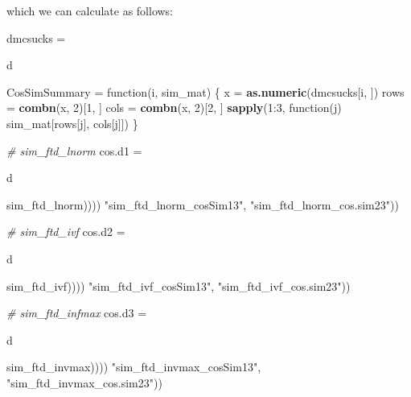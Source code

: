 \documentclass[10pt]{report}
\newenvironment{Shaded}{}{}
\newcommand{\KeywordTok}[1]{\textcolor[rgb]{0.00,0.44,0.13}{\textbf{{#1}}}}
\newcommand{\DecValTok}[1]{\textcolor[rgb]{0.25,0.63,0.44}{{#1}}}
\newcommand{\StringTok}[1]{\textcolor[rgb]{0.25,0.44,0.63}{{#1}}}
\newcommand{\CommentTok}[1]{\textcolor[rgb]{0.38,0.63,0.69}{\textit{{#1}}}}
\newcommand{\NormalTok}[1]{{#1}}
\begin{document}
which we can calculate as follows:

\begin{Shaded}
\begin{Highlighting}[]
\NormalTok{dmcsucks =}\StringTok{ }\NormalTok{d %>%}\StringTok{ }\KeywordTok{arrange}\NormalTok{(orderID) %>%}\StringTok{ }\KeywordTok{select}\NormalTok{(couponID1, couponID2, couponID3)}

\NormalTok{CosSimSummary =}\StringTok{ }\NormalTok{function(i, sim_mat) \{}
    \NormalTok{x =}\StringTok{ }\KeywordTok{as.numeric}\NormalTok{(dmcsucks[i, ])}
    \NormalTok{rows =}\StringTok{ }\KeywordTok{combn}\NormalTok{(x, }\DecValTok{2}\NormalTok{)[}\DecValTok{1}\NormalTok{, ]}
    \NormalTok{cols =}\StringTok{ }\KeywordTok{combn}\NormalTok{(x, }\DecValTok{2}\NormalTok{)[}\DecValTok{2}\NormalTok{, ]}
    \KeywordTok{sapply}\NormalTok{(}\DecValTok{1}\NormalTok{:}\DecValTok{3}\NormalTok{, function(j) sim_mat[rows[j], cols[j]])}
\NormalTok{\}}

\CommentTok{# sim_ftd_lnorm}
\NormalTok{cos.d1 =}\StringTok{ }\NormalTok{d %>%}\StringTok{ }\KeywordTok{select}\NormalTok{(orderID) %>%}\StringTok{ }\KeywordTok{cbind}\NormalTok{(}\KeywordTok{t}\NormalTok{(}\KeywordTok{sapply}\NormalTok{(}\DecValTok{1}\NormalTok{:}\KeywordTok{nrow}\NormalTok{(dmcsucks), function(i) }\KeywordTok{CosSimSummary}\NormalTok{(i, }
    \NormalTok{sim_ftd_lnorm)))) %>%}\StringTok{ }\NormalTok{data.frame %>%}\StringTok{ }\KeywordTok{renm}\NormalTok{(}\KeywordTok{c}\NormalTok{(}\StringTok{"orderID"}\NormalTok{, }\StringTok{"sim_ftd_lnorm_cosSim12"}\NormalTok{, }
    \StringTok{"sim_ftd_lnorm_cosSim13"}\NormalTok{, }\StringTok{"sim_ftd_lnorm_cos.sim23"}\NormalTok{))}

\CommentTok{# sim_ftd_ivf}
\NormalTok{cos.d2 =}\StringTok{ }\NormalTok{d %>%}\StringTok{ }\KeywordTok{select}\NormalTok{(orderID) %>%}\StringTok{ }\KeywordTok{cbind}\NormalTok{(}\KeywordTok{t}\NormalTok{(}\KeywordTok{sapply}\NormalTok{(}\DecValTok{1}\NormalTok{:}\KeywordTok{nrow}\NormalTok{(dmcsucks), function(i) }\KeywordTok{CosSimSummary}\NormalTok{(i, }
    \NormalTok{sim_ftd_ivf)))) %>%}\StringTok{ }\NormalTok{data.frame %>%}\StringTok{ }\KeywordTok{renm}\NormalTok{(}\KeywordTok{c}\NormalTok{(}\StringTok{"orderID"}\NormalTok{, }\StringTok{"sim_ftd_ivf_cosSim12"}\NormalTok{, }
    \StringTok{"sim_ftd_ivf_cosSim13"}\NormalTok{, }\StringTok{"sim_ftd_ivf_cos.sim23"}\NormalTok{))}

\CommentTok{# sim_ftd_infmax}
\NormalTok{cos.d3 =}\StringTok{ }\NormalTok{d %>%}\StringTok{ }\KeywordTok{select}\NormalTok{(orderID) %>%}\StringTok{ }\KeywordTok{cbind}\NormalTok{(}\KeywordTok{t}\NormalTok{(}\KeywordTok{sapply}\NormalTok{(}\DecValTok{1}\NormalTok{:}\KeywordTok{nrow}\NormalTok{(dmcsucks), function(i) }\KeywordTok{CosSimSummary}\NormalTok{(i, }
    \NormalTok{sim_ftd_invmax)))) %>%}\StringTok{ }\NormalTok{data.frame %>%}\StringTok{ }\KeywordTok{renm}\NormalTok{(}\KeywordTok{c}\NormalTok{(}\StringTok{"orderID"}\NormalTok{, }\StringTok{"sim_ftd_invmax_cosSim12"}\NormalTok{, }
    \StringTok{"sim_ftd_invmax_cosSim13"}\NormalTok{, }\StringTok{"sim_ftd_invmax_cos.sim23"}\NormalTok{))}

}}}}}}}
\end{Highlighting}
\end{Shaded}
\end{document}
